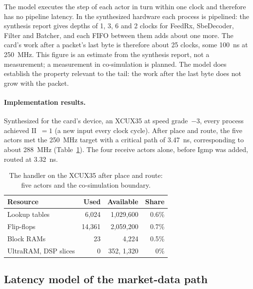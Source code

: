 \documentclass[11pt]{article}
\begin{document}
The model executes the step of each actor in turn within one clock and
therefore has no pipeline latency. In the synthesized hardware each process is
pipelined: the synthesis report gives depths of 1, 3, 6 and 2 clocks for
FeedRx, SbeDecoder, Filter and Batcher, and each FIFO between them adds about
one more. The card's work after a packet's last byte is therefore about 25
clocks, some 100~ns at 250~MHz. This figure is an estimate from the synthesis
report, not a measurement; a measurement in co-simulation is planned. The model
does establish the property relevant to the tail: the work after the last byte
does not grow with the packet.

\paragraph{Implementation results.} Synthesized for the card's device, an
XCUX35 at speed grade~$-3$, every process achieved II~$=1$ (a new input every clock cycle). After place and
route, the five actors met the 250~MHz target with a critical path of 3.47~ns,
corresponding to about 288~MHz (Table~\ref{tab:resources}). The four receive
actors alone, before Igmp was added, routed at 3.32~ns.

\begin{table}[h]
\centering
\caption{The handler on the XCUX35 after place and route: five actors and the
co-simulation boundary.}
\label{tab:resources}
\small
\begin{tabular}{l r r r}
\toprule
Resource & Used & Available & Share \\
\midrule
Lookup tables & 6{,}024 & 1{,}029{,}600 & 0.6\% \\
Flip-flops & 14{,}361 & 2{,}059{,}200 & 0.7\% \\
Block RAMs & 23 & 4{,}224 & 0.5\% \\
UltraRAM, DSP slices & 0 & 352, 1{,}320 & 0\% \\
\bottomrule
\end{tabular}
\end{table}

\subsection{Latency model of the market-data path}
\label{sec:model}
\end{document}
